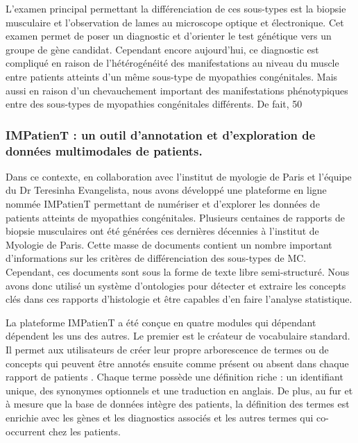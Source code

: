 L’examen principal permettant la différenciation de ces sous-types est la biopsie musculaire et l’observation de lames au microscope optique et électronique. Cet examen permet de poser un diagnostic et d’orienter le test génétique vers un groupe de gène candidat. 
Cependant encore aujourd’hui, ce diagnostic est compliqué en raison de l’hétérogénéité des manifestations au niveau du muscle entre patients atteints d’un même sous-type de myopathies congénitales. Mais aussi en raison d’un chevauchement important des manifestations phénotypiques entre des sous-types de myopathies congénitales différents. De fait, 50 %

\subsubsection{IMPatienT : un outil d’annotation et d’exploration de données multimodales de patients.}
Dans ce contexte, en collaboration avec l’institut de myologie de Paris et l’équipe du Dr Teresinha Evangelista, nous avons développé une plateforme en ligne nommée IMPatienT permettant de numériser et d’explorer les données de patients atteints de myopathies congénitales. Plusieurs centaines de rapports de biopsie musculaires ont été générées ces dernières décennies à l’institut de Myologie de Paris. Cette masse de documents contient un nombre important d’informations sur les critères de différenciation des sous-types de MC. Cependant, ces documents sont sous la forme de texte libre semi-structuré. Nous avons donc utilisé un système d’ontologies pour détecter et extraire les concepts clés dans ces rapports d’histologie et être capables d’en faire l’analyse statistique.

La plateforme IMPatienT a été conçue en quatre modules qui dépendant dépendent les uns des autres.
Le premier est le créateur de vocabulaire standard. Il permet aux utilisateurs de créer leur propre arborescence de termes ou de concepts qui peuvent être annotés ensuite comme présent ou absent dans chaque rapport de patients . Chaque terme possède une définition riche : un identifiant unique, des synonymes optionnels et une traduction en anglais. De plus, au fur et à mesure que la base de données intègre des patients, la définition des termes est enrichie avec les gènes et les diagnostics associés et les autres termes qui co-occurrent chez les patients.

